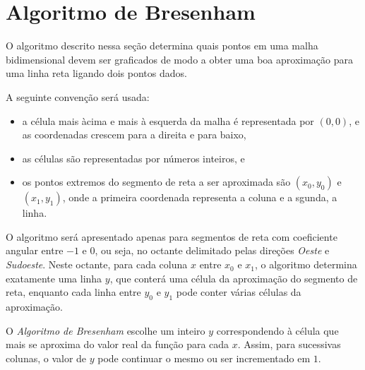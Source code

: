 %
%
%

\section{Algoritmo de Bresenham} \label{sse:bresenham_line}
O algoritmo descrito nessa seção determina quais pontos em uma malha
bidimensional devem ser graficados de modo a obter uma boa aproximação
para uma linha reta ligando dois pontos dados.

A seguinte convenção será usada:
\begin{itemize}
\item a célula mais àcima e mais à esquerda da malha é representada por $(0,0)$,
e as coordenadas crescem para a direita e para baixo,
\item as células são representadas por números inteiros, e
\item os pontos extremos do segmento de reta a ser aproximada são $(x_0,y_0)$
e  $(x_1,y_1)$, onde a primeira coordenada representa a coluna e a sgunda, a
linha.
\end{itemize}

O algoritmo será apresentado apenas para segmentos de reta com coeficiente
angular entre $-1$ e $0$, ou seja, no octante delimitado pelas direções
\emph{Oeste} e \emph{Sudoeste}. Neste octante, para cada coluna $x$ entre $x_0$
e $x_1$, o algoritmo determina exatamente uma linha $y$, que conterá uma célula
da aproximação do segmento de reta, enquanto cada linha entre $y_0$ e $y_1$
pode conter várias células da aproximação.

O \emph{Algoritmo de Bresenham} escolhe um inteiro $y$ correspondendo à célula
que mais se aproxima do valor real da função para cada $x$. Assim, para
sucessivas colunas, o valor de $y$ pode continuar o mesmo ou ser incrementado
em $1$.

